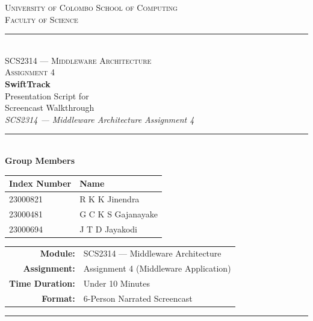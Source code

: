 \documentclass[12pt,a4paper]{article}
\begin{document}
\begin{titlepage}
  \centering
  \vspace*{1.5cm}
  
  {\large\textsc{University of Colombo School of Computing}}\\[0.3cm]
  {\normalsize\textsc{Faculty of Science}}\\[0.2cm]
  \rule{\textwidth}{0.5pt}\\[1.5cm]
  
  {\LARGE\textsc{SCS2314 --- Middleware Architecture}}\\[0.4cm]
  {\large\textsc{Assignment 4}}\\[1.5cm]
  
  {\Huge\bfseries\color{navy} SwiftTrack}\\[0.5cm]
  {\LARGE Presentation Script for\\Screencast Walkthrough}\\[0.3cm]
  {\large\textit{SCS2314 --- Middleware Architecture Assignment 4}}\\[2cm]
  
  \rule{0.6\textwidth}{0.3pt}\\[1cm]
  
  {\large\textbf{Group Members}}\\[0.5cm]
  
  \begin{tabular}{|l|l|}
    \hline
    \textbf{Index Number} & \textbf{Name} \\
    \hline
    23000821 & R K K Jinendra \\
    \hline
    23000481 & G C K S Gajanayake \\
    \hline
    23000694 & J T D Jayakodi \\
    \hline
  \end{tabular}
  
  \vfill
  
  \begin{tabular}{rl}
    \textbf{Module:} & SCS2314 --- Middleware Architecture \\
    \textbf{Assignment:} & Assignment 4 (Middleware Application) \\
    \textbf{Time Duration:} & Under 10 Minutes \\
    \textbf{Format:} & 6-Person Narrated Screencast \\
  \end{tabular}
  
  \vspace{1cm}
  \rule{\textwidth}{0.5pt}
\end{titlepage}
\end{document}
